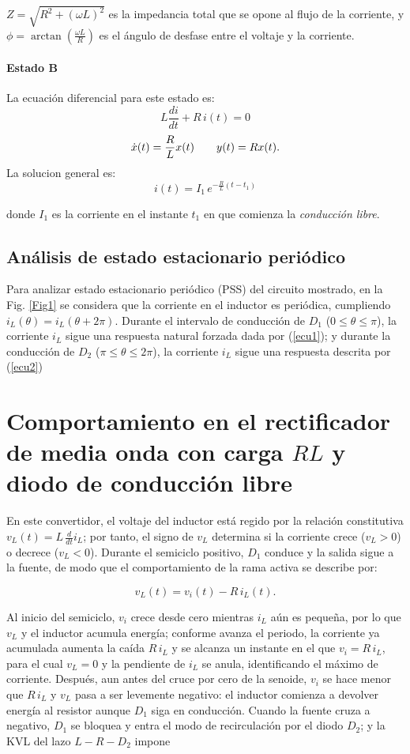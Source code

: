 \documentclass[conference]{IEEEtran}
\begin{document}
$Z = \sqrt{R^2 + (\omega L)^2}$ es la impedancia total que se opone al flujo de la corriente, y $\phi = \arctan\left(\frac{\omega L}{R}\right)$ es el ángulo de desfase entre el voltaje y la corriente. 

\paragraph{Estado B}
La ecuación diferencial para este estado es:
\[
L\frac{di}{dt} + R\,i(t) = 0
\]
\[
\dot{x}(t)
=
\-\dfrac{R}{L}
x(t)
\qquad
y(t)=Rx(t).
\]
La solucion general es:
\begin{equation}
i(t)=I_1\,e^{-\frac{R}{L}(t-t_1)}
\label{ecu2}
\end{equation}

donde \(I_1\) es la corriente en el instante \(t_1\) en que comienza la \emph{conducción libre}.
\subsection{Análisis de estado estacionario periódico}
Para analizar estado estacionario periódico (PSS) del circuito mostrado, en la Fig. \ref{Fig1} se considera que la corriente en el inductor
es periódica, cumpliendo $i_L(\theta)=i_L(\theta+2\pi)$. Durante el intervalo de conducción de $D_1$ ($0 \leq \theta \leq \pi$), la corriente $i_L$ sigue una respuesta natural forzada
dada por (\ref{ecu1}); y durante la conducción de $D_2$ ($\pi \leq \theta \leq 2\pi$), la corriente $i_L$ sigue una respuesta descrita por (\ref{ecu2})

\section{Comportamiento en el rectificador de media onda con carga $RL$ y diodo de conducción libre}
En este convertidor, el voltaje del inductor está regido por la relación constitutiva $v_L(t)=L\,\tfrac{d}{dt}i_L$; por tanto, el signo de $v_L$ determina si la corriente crece ($v_L>0$) o decrece ($v_L<0$). Durante el semiciclo positivo, $D_1$ conduce y la salida sigue a la fuente, de modo que el comportamiento de la rama activa se describe por:

\begin{equation*}
	v_L(t)=v_i(t)-R\,i_L(t).
\end{equation*}

Al inicio del semiciclo, $v_i$ crece desde cero mientras $i_L$ aún es pequeña, por lo que $v_L$ y el inductor acumula energía; conforme avanza el periodo, la corriente ya acumulada aumenta la caída $R\,i_L$ y se alcanza un instante en el que $v_i=R\,i_L$, para el cual $v_L=0$ y la pendiente de $i_L$ se anula, identificando el máximo de corriente. Después, aun antes del cruce por cero de la senoide, $v_i$ se hace menor que $R\,i_L$ y $v_L$ pasa a ser levemente negativo: el inductor comienza a devolver energía al resistor aunque $D_1$ siga en conducción. Cuando la fuente cruza a negativo, $D_1$ se bloquea y entra el modo de recirculación por el diodo $D_2$; y la KVL del lazo $L\!-\!R\!-\!D_2$ impone
\end{document}
